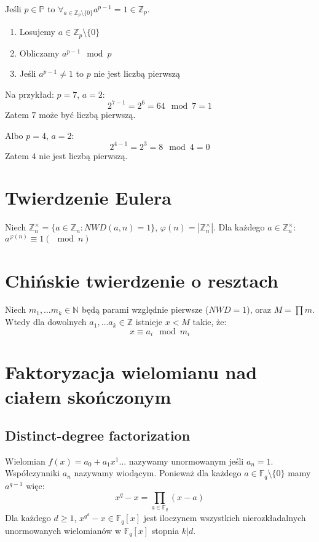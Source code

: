 \documentclass{../notatki}
\begin{document}
Jeśli $p \in \mathbb{P}$ to $\forall_{a \in \mathbb{Z}_p \setminus
\{0\}} a^{p - 1} = 1 \in \mathbb{Z}_p$.

\begin{enumerate}
  \item Losujemy $a \in \mathbb{Z}_p \setminus \{0\}$
  \item Obliczamy $a^{p - 1} \mod p$
  \item Jeśli $a^{p - 1} \ne 1$ to $p$ nie jest liczbą pierwszą
\end{enumerate}

\noindent
Na przykład: $p = 7$, $a = 2$:
$$
2^{7 - 1} = 2^6 = 64 \mod 7 = 1
$$
Zatem $7$ może być liczbą pierwszą.

\noindent
Albo $p = 4$, $a = 2$:
$$
2^{4 - 1} = 2^3 = 8 \mod 4 = 0
$$
Zatem $4$ nie jest liczbą pierwszą.

\section{Twierdzenie Eulera}

Niech $\mathbb{Z}_n^\times = \{a \in \mathbb{Z}_n : NWD(a,n) = 1\}$,
$\varphi(n) = |\mathbb{Z}_n^\times|$. Dla każdego $a \in \mathbb{Z}_n^\times$:
$a^{\varphi(n)} \equiv 1 (\mod n)$

\section{Chińskie twierdzenie o resztach}

Niech $m_1, \dots m_k \in \mathbb{N}$ będą parami względnie pierwsze
($NWD = 1$), oraz $M = \prod m$. Wtedy dla dowolnych $a_1, \dots a_k
\in \mathbb{Z}$ istnieje $x < M$ takie, że:
$$
x \equiv a_i \mod m_i
$$

\section{Faktoryzacja wielomianu nad ciałem skończonym}

\subsection{Distinct-degree factorization}

Wielomian $f(x) = a_0 + a_1x^1 \dots$ nazywamy unormowanym jeśli $a_n = 1$.
Współczynniki $a_n$ nazywamy wiodącym. Ponieważ dla każdego $a \in
\mathbb{F}_q \setminus \{0\}$ mamy $a^{q-1}$ więc:
$$
x^q - x = \prod_{a \in \mathbb{F}_q} (x - a)
$$
Dla każdego $d \ge 1$, $x^{q^d} - x \in \mathbb{F}_q[x]$ jest
iloczynem wszystkich
nierozkładalnych unormowanych wielomianów w $\mathbb{F}_q[x]$ stopnia $k|d$.
\end{document}
